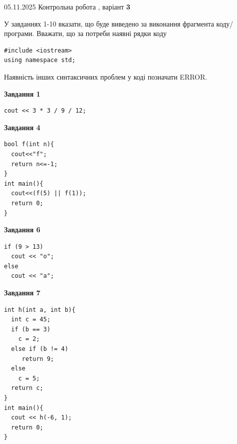 \documentclass[12pt, ukrainian]{article}
\begin{document}
\newpage

{\Large{05.11.2025 Контрольна робота , варіант  \No \textbf { 3 }\par}}
{
\begin {large}
У завданнях 1-10 вказати, що буде виведено за виконання фрагмента коду/про\-гра\-ми.
Вважати, що за потреби наявні рядки коду
\begin{verbatim}
#include <iostream>
using namespace std;
\end{verbatim}
Наявність інших синтаксичних проблем у коді позначати ERROR.

\begin{minipage}[t]{7.0cm}

\begin{center}
\textbf{Завдання 1}
\end{center}
\vspace{-8mm}

\begin{verbatim}
cout << 3 * 3 / 9 / 12;
\end{verbatim}



\begin{center}
\textbf{Завдання 4}
\end{center}
\vspace{-8mm}

\begin{verbatim}
bool f(int n){
  cout<<"f";
  return n<=-1;
}
int main(){
  cout<<(f(5) || f(1));
  return 0;
}
\end{verbatim}



\begin{center}
\textbf{Завдання 6}
\end{center}
\vspace{-8mm}

\begin{verbatim}
if (9 > 13)
  cout << "o";
else
  cout << "a";
\end{verbatim}



\begin{center}
\textbf{Завдання 7}
\end{center}
\vspace{-8mm}

\begin{verbatim}
int h(int a, int b){
  int c = 45;
  if (b == 3)
    c = 2;
  else if (b != 4)
     return 9;
  else
    c = 5;
  return c;
}
int main(){
  cout << h(-6, 1);
  return 0;
}
\end{verbatim}


\end{minipage}
\end{large}}
\end{document}
